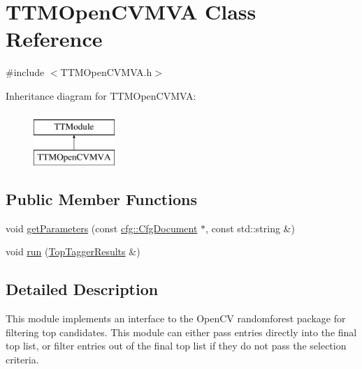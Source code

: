\hypertarget{classTTMOpenCVMVA}{\section{T\-T\-M\-Open\-C\-V\-M\-V\-A Class Reference}
\label{classTTMOpenCVMVA}
}


{\ttfamily \#include $<$T\-T\-M\-Open\-C\-V\-M\-V\-A.\-h$>$}

Inheritance diagram for T\-T\-M\-Open\-C\-V\-M\-V\-A\-:\begin{figure}[H]
\begin{center}
\leavevmode
\includegraphics[height=2.000000cm]{classTTMOpenCVMVA}
\end{center}
\end{figure}
\subsection*{Public Member Functions}
\begin{DoxyCompactItemize}
\item 
void \hyperlink{classTTMOpenCVMVA_a9842e490d60a486958ba93b6f0f5d00e}{get\-Parameters} (const \hyperlink{classcfg_1_1CfgDocument}{cfg\-::\-Cfg\-Document} $\ast$, const std\-::string \&)
\item 
void \hyperlink{classTTMOpenCVMVA_af51d1bf351304ef8c6e732763d58c433}{run} (\hyperlink{classTopTaggerResults}{Top\-Tagger\-Results} \&)
\end{DoxyCompactItemize}


\subsection{Detailed Description}
This module implements an interface to the Open\-C\-V randomforest package for filtering top candidates. This module can either pass entries directly into the final top list, or filter entries out of the final top list if they do not pass the selection criteria.


